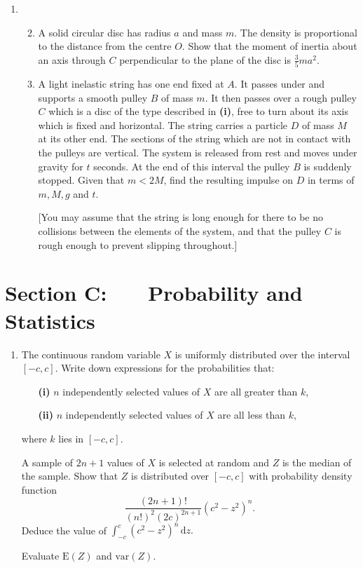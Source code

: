 \documentclass[a4, 11pt]{report}
\newlength{\qspace}
\newcounter{qnumber}
\newenvironment{question}%
 {\vspace{\qspace}
  \begin{enumerate}[\bfseries 1\quad][10]%
    \setcounter{enumi}{\value{qnumber}}%
    \item%
 }
{
  \end{enumerate}
  \filbreak
  \stepcounter{qnumber}
 }
\newenvironment{questionparts}[1][1]%
 {
  \begin{enumerate}[\bfseries (i)]%
    \setcounter{enumii}{#1}
    \addtocounter{enumii}{-1}
    \setlength{\itemsep}{5mm}
    \setlength{\parskip}{8pt}
 }
 {
  \end{enumerate}
 }
\begin{document}
\begin{question}
\begin{questionparts} \item A solid circular disc has radius $a$ and
mass $m.$ The density is proportional to the distance from the centre
$O$. Show that the moment of inertia about an axis through $C$ perpendicular
to the plane of the disc is $\frac{3}{5}ma^{2}.$


\item A light inelastic string has one end fixed at $A$. It passes
under and supports a smooth pulley $B$ of mass $m.$ It then passes
over a rough pulley $C$ which is a disc of the type described in
\textbf{(i)}, free to turn about its axis which is fixed and horizontal.
The string carries a particle $D$ of mass $M$ at its other end.
The sections of the string which are not in contact with the pulleys
are vertical. The system is released from rest and moves under gravity
for $t$ seconds. At the end of this interval the pulley $B$ is suddenly
stopped. Given that $m<2M$, find the resulting impulse on $D$ in
terms of $m,M,g$ and $t$. 


{[}You may assume that the string is long enough for there to be no
collisions between the elements of the system, and that the pulley
$C$ is rough enough to prevent slipping throughout.{]} \end{questionparts}

\end{question}
	
	\newpage
\section*{Section C: \ \ \ Probability and Statistics}


\begin{question}
The continuous random variable $X$ is uniformly distributed over
the interval $[-c,c].$ Write down expressions for the probabilities
that: 

\begin{itemize}
\setlength{\itemsep}{3mm}
\item[\bf (i)] $n$ independently selected values of $X$ are all greater than $k$, 
\item[\bf (ii)] $n$ independently selected values of $X$ are all less than $k$,
\end{itemize}

where $k$ lies in $[-c,c]$. 


A sample of $2n+1$ values of $X$ is selected at random and $Z$
is the median of the sample. Show that $Z$ is distributed over $[-c,c]$
with probability density function 
\[
\frac{(2n+1)!}{(n!)^{2}(2c)^{2n+1}}(c^{2}-z^{2})^{n}.
\]
Deduce the value of ${\displaystyle \int_{-c}^{c}(c^{2}-z^{2})^{n}\,\mathrm{d}z.}$


Evaluate $\mathrm{E}(Z)$ and $\mathrm{var}(Z).$  
\end{question}
\end{document}
